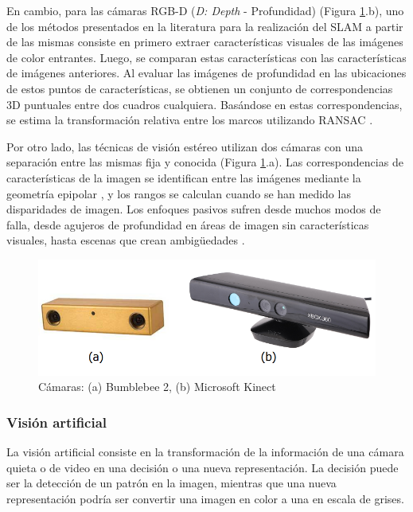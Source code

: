 En cambio, para las cámaras RGB-D (\textit{D: Depth} - Profundidad) (Figura \ref{fig:camaras}.b), uno de los métodos presentados en la literatura para la realización del SLAM a partir de las mismas \cite{endres2012} consiste en primero extraer características visuales de las imágenes de color entrantes. Luego, se comparan estas características con las características de imágenes anteriores. Al evaluar las imágenes de profundidad en las ubicaciones de estos puntos de características, se obtienen un conjunto de correspondencias 3D puntuales entre dos cuadros cualquiera. Basándose en estas correspondencias, se estima la transformación relativa entre los marcos utilizando RANSAC \cite{trivedi2013}.

Por otro lado, las técnicas de visión estéreo utilizan dos cámaras con una separación entre las mismas fija y conocida (Figura \ref{fig:camaras}.a). Las correspondencias de características de la imagen se identifican entre las imágenes mediante la geometría epipolar \cite{kaehler2017}, y los rangos se calculan cuando se han medido las disparidades de imagen. Los enfoques pasivos sufren desde muchos modos de falla, desde agujeros de profundidad en áreas de imagen sin características visuales, hasta escenas que crean ambigüedades \cite{wichert1997}.

\begin{figure}
    \centering
    \includegraphics[width=.9\linewidth]{Img/bumblekinect}
    \caption{Cámaras: (a) Bumblebee 2, (b) Microsoft Kinect}
    \label{fig:camaras}
\end{figure}

\subsubsection{Visión artificial}
La visión artificial consiste en la transformación de la información de una cámara quieta o de video en una decisión o una nueva representación. La decisión puede ser la detección de un patrón en la imagen, mientras que una nueva representación podría ser convertir una imagen en color a una en escala de grises.

